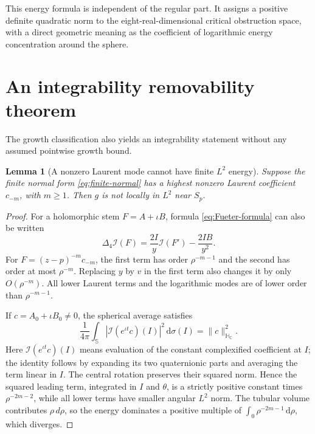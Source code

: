 \documentclass[11pt,a4paper]{article}
\numberwithin{equation}{section}
\newtheorem{lemma}[theorem]{Lemma}
\theoremstyle{definition}
\theoremstyle{remark}
\newcommand{\C}{\mathbb C}
\newcommand{\HC}{\mathbb H_{\C}}
\newcommand{\SSS}{\mathbb S}
\newcommand{\cI}{\mathcal I}
\newcommand{\lap}{\Delta_4}
\newcommand{\dd}{\,\mathrm d}
\newcommand{\norm}[1]{\lVert #1\rVert}
\begin{document}
This energy formula is independent of the regular part. It assigns a positive
definite quadratic norm to the eight-real-dimensional critical obstruction
space, with a direct geometric meaning as the coefficient of logarithmic
energy concentration around the sphere.

\section{An integrability removability theorem}
\label{sec:L2}

The growth classification also yields an integrability statement without any
assumed pointwise growth bound.

\begin{lemma}[A nonzero Laurent mode cannot have finite $L^2$ energy]
\label{lem:pole-energy}
Suppose the finite normal form \eqref{eq:finite-normal} has a highest nonzero
Laurent coefficient $c_{-m}$, with $m\geq1$. Then $g$ is not locally in $L^2$
near $S_p$.
\end{lemma}
\begin{proof}
For a holomorphic stem $F=A+\iota B$, formula \eqref{eq:Fueter-formula} can
also be written
\begin{equation}\label{eq:first-derivative-leading}
 \lap\cI(F)=\frac{2I}{y}\cI(F')-\frac{2IB}{y^2}.
\end{equation}
For $F=(z-p)^{-m}c_{-m}$, the first term has order $\rho^{-m-1}$ and the
second has order at most $\rho^{-m}$. Replacing $y$ by $v$ in the first term
also changes it by only $O(\rho^{-m})$. All lower Laurent terms and the
logarithmic modes are of lower order than $\rho^{-m-1}$.

If $c=A_0+\iota B_0\ne0$, the spherical average satisfies
\[
 \frac1{4\pi}\int_{\SSS}|\cI(e^{\iota t}c)(I)|^2\dd\sigma(I)
   =\norm{c}_{\HC}^2.
\]
Here $\cI(e^{\iota t}c)(I)$ means evaluation of the constant complexified
coefficient at $I$; the identity follows by expanding its two quaternionic
parts and averaging the term linear in $I$. The central rotation preserves
their squared norm. Hence the squared leading term, integrated in $I$ and
$\theta$, is a strictly positive constant times $\rho^{-2m-2}$, while all
lower terms have smaller angular $L^2$ norm. The tubular volume contributes
$\rho\,d\rho$, so the energy dominates a positive multiple of
$\int_0 \rho^{-2m-1}\dd\rho$, which diverges.
\end{proof}
\end{document}
